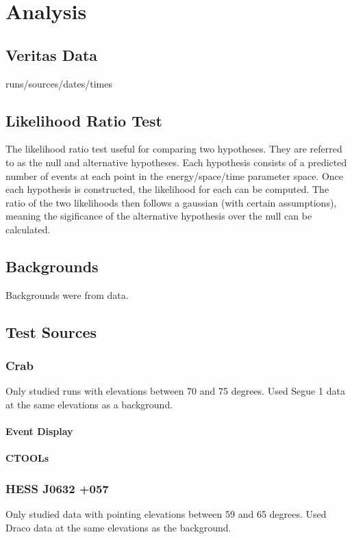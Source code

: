 \cleartooddpage[\thispagestyle{empty}]
\chapter{Analysis}

\section{Veritas Data}
runs/sources/dates/times

\section{Likelihood Ratio Test}
The likelihood ratio test useful for comparing two hypotheses.
They are referred to as the null and alternative hypotheses.
Each hypothesis consists of a predicted number of events at each point in the energy/space/time parameter space.
Once each hypothesis is constructed, the likelihood for each can be computed.
The ratio of the two likelihoods then follows a gaussian (with certain assumptions), meaning the sigificance of the alternative hypothesis over the null can be calculated.

\section{Backgrounds}

Backgrounds were from data.

\section{Test Sources}

  \subsection{Crab}
    Only studied runs with elevations between 70 and 75 degrees.
    Used Segue 1 data at the same elevations as a background.

    \subsubsection{Event Display}
    \subsubsection{CTOOLs}

  \subsection{HESS J0632 +057}
    Only studied data with pointing elevations between 59 and 65 degrees.
    Used Draco data at the same elevations as the background.

